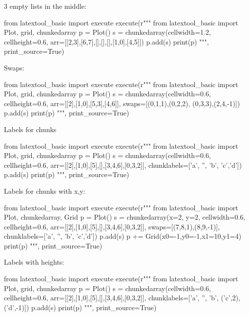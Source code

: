 3 empty lists in the middle:
\begin{python}
from latextool_basic import execute
execute(r"""
from latextool_basic import Plot, grid, chunkedarray
p = Plot()
s = chunkedarray(cellwidth=1.2,
                 cellheight=0.6,
                 arr=[[2,3],[6,7],[],[],[],[1,0],[4,5]])
p.add(s)
print(p)
""", print_source=True)
\end{python}





Swaps:
\begin{python}
from latextool_basic import execute
execute(r"""
from latextool_basic import Plot, grid, chunkedarray
p = Plot()
s = chunkedarray(cellwidth=0.6,
                 cellheight=0.6,
                 arr=[[2],[1,0],[5,3],[4,6]],
                 swaps=[(0,1,1),(0,2,2), (0,3,3),(2,4,-1)])
p.add(s)
print(p)
""", print_source=True)
\end{python}




\newpage
Labels for chunks
\begin{python}
from latextool_basic import execute
execute(r"""
from latextool_basic import Plot, grid, chunkedarray
p = Plot()
s = chunkedarray(cellwidth=0.6,
                 cellheight=0.6,
                 arr=[[2],[1,0],[5],[],[3,4,6],[0,3,2]],
                 chunklabels=['a', '', 'b', 'c','d'])
p.add(s)
print(p)
""", print_source=True)
\end{python}

Labels for chunks with x,y:
\begin{python}
from latextool_basic import execute
execute(r"""
from latextool_basic import Plot, chunkedarray, Grid
p = Plot()
s = chunkedarray(x=2, y=2,
                 cellwidth=0.6,
                 cellheight=0.6,
                 arr=[[2],[1,0],[5],[],[3,4,6],[0,3,2]],
                 swaps=[(7,8,1),(8,9,-1)],
                 chunklabels=['a', '', 'b', 'c','d'])
p.add(s)
p += Grid(x0=-1,y0=-1,x1=10,y1=4)
print(p)
""", print_source=True)
\end{python}




Labels with heights:
\begin{python}
from latextool_basic import execute
execute(r"""
from latextool_basic import Plot, grid, chunkedarray
p = Plot()
s = chunkedarray(cellwidth=0.6,
                 cellheight=0.6,
                 arr=[[2],[1,0],[5],[],[3,4,6],[0,3,2]],
                 chunklabels=['a', '', 'b', ('c',2),('d',-1)])
p.add(s)
print(p)
""", print_source=True)
\end{python}




